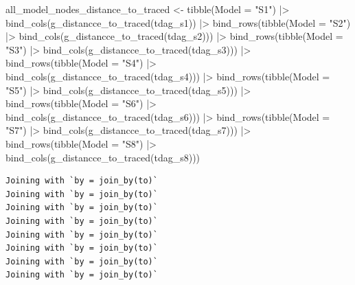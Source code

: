 \documentclass[
  letterpaper,
  DIV=11,
  numbers=noendperiod]{scrartcl}
\newenvironment{Shaded}{\begin{snugshade}}{\end{snugshade}}
\newcommand{\AttributeTok}[1]{\textcolor[rgb]{0.40,0.45,0.13}{#1}}
\newcommand{\FunctionTok}[1]{\textcolor[rgb]{0.28,0.35,0.67}{#1}}
\newcommand{\NormalTok}[1]{\textcolor[rgb]{0.00,0.23,0.31}{#1}}
\newcommand{\OtherTok}[1]{\textcolor[rgb]{0.00,0.23,0.31}{#1}}
\newcommand{\SpecialCharTok}[1]{\textcolor[rgb]{0.37,0.37,0.37}{#1}}
\newcommand{\StringTok}[1]{\textcolor[rgb]{0.13,0.47,0.30}{#1}}
\begin{document}
\begin{Shaded}
\begin{Highlighting}[]
\NormalTok{all\_model\_nodes\_distance\_to\_traced }\OtherTok{\textless{}{-}} 
    \FunctionTok{tibble}\NormalTok{(}\AttributeTok{Model =} \StringTok{"S1"}\NormalTok{) }\SpecialCharTok{|\textgreater{}} \FunctionTok{bind\_cols}\NormalTok{(}\FunctionTok{g\_distancce\_to\_traced}\NormalTok{(tdag\_s1)) }\SpecialCharTok{|\textgreater{}} 
    \FunctionTok{bind\_rows}\NormalTok{(}\FunctionTok{tibble}\NormalTok{(}\AttributeTok{Model =} \StringTok{"S2"}\NormalTok{) }\SpecialCharTok{|\textgreater{}} \FunctionTok{bind\_cols}\NormalTok{(}\FunctionTok{g\_distancce\_to\_traced}\NormalTok{(tdag\_s2))) }\SpecialCharTok{|\textgreater{}} 
    \FunctionTok{bind\_rows}\NormalTok{(}\FunctionTok{tibble}\NormalTok{(}\AttributeTok{Model =} \StringTok{"S3"}\NormalTok{) }\SpecialCharTok{|\textgreater{}} \FunctionTok{bind\_cols}\NormalTok{(}\FunctionTok{g\_distancce\_to\_traced}\NormalTok{(tdag\_s3))) }\SpecialCharTok{|\textgreater{}} 
    \FunctionTok{bind\_rows}\NormalTok{(}\FunctionTok{tibble}\NormalTok{(}\AttributeTok{Model =} \StringTok{"S4"}\NormalTok{) }\SpecialCharTok{|\textgreater{}} \FunctionTok{bind\_cols}\NormalTok{(}\FunctionTok{g\_distancce\_to\_traced}\NormalTok{(tdag\_s4))) }\SpecialCharTok{|\textgreater{}} 
    \FunctionTok{bind\_rows}\NormalTok{(}\FunctionTok{tibble}\NormalTok{(}\AttributeTok{Model =} \StringTok{"S5"}\NormalTok{) }\SpecialCharTok{|\textgreater{}} \FunctionTok{bind\_cols}\NormalTok{(}\FunctionTok{g\_distancce\_to\_traced}\NormalTok{(tdag\_s5))) }\SpecialCharTok{|\textgreater{}} 
    \FunctionTok{bind\_rows}\NormalTok{(}\FunctionTok{tibble}\NormalTok{(}\AttributeTok{Model =} \StringTok{"S6"}\NormalTok{) }\SpecialCharTok{|\textgreater{}} \FunctionTok{bind\_cols}\NormalTok{(}\FunctionTok{g\_distancce\_to\_traced}\NormalTok{(tdag\_s6))) }\SpecialCharTok{|\textgreater{}} 
    \FunctionTok{bind\_rows}\NormalTok{(}\FunctionTok{tibble}\NormalTok{(}\AttributeTok{Model =} \StringTok{"S7"}\NormalTok{) }\SpecialCharTok{|\textgreater{}} \FunctionTok{bind\_cols}\NormalTok{(}\FunctionTok{g\_distancce\_to\_traced}\NormalTok{(tdag\_s7))) }\SpecialCharTok{|\textgreater{}} 
    \FunctionTok{bind\_rows}\NormalTok{(}\FunctionTok{tibble}\NormalTok{(}\AttributeTok{Model =} \StringTok{"S8"}\NormalTok{) }\SpecialCharTok{|\textgreater{}} \FunctionTok{bind\_cols}\NormalTok{(}\FunctionTok{g\_distancce\_to\_traced}\NormalTok{(tdag\_s8))) }
\end{Highlighting}
\end{Shaded}

\begin{verbatim}
Joining with `by = join_by(to)`
Joining with `by = join_by(to)`
Joining with `by = join_by(to)`
Joining with `by = join_by(to)`
Joining with `by = join_by(to)`
Joining with `by = join_by(to)`
Joining with `by = join_by(to)`
Joining with `by = join_by(to)`
\end{verbatim}
\end{document}

